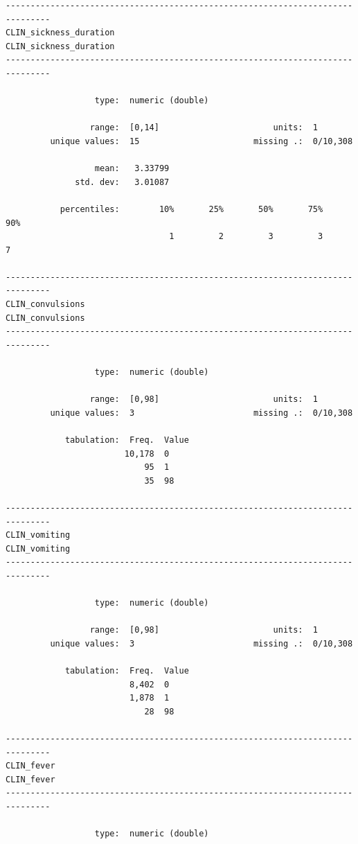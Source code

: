 \documentclass[
  letterpaper,
  DIV=11,
  numbers=noendperiod]{scrreprt}
\begin{document}
\begin{verbatim}
-------------------------------------------------------------------------------
CLIN_sickness_duration                                   CLIN_sickness_duration
-------------------------------------------------------------------------------

                  type:  numeric (double)

                 range:  [0,14]                       units:  1
         unique values:  15                       missing .:  0/10,308

                  mean:   3.33799
              std. dev:   3.01087

           percentiles:        10%       25%       50%       75%       90%
                                 1         2         3         3         7

-------------------------------------------------------------------------------
CLIN_convulsions                                               CLIN_convulsions
-------------------------------------------------------------------------------

                  type:  numeric (double)

                 range:  [0,98]                       units:  1
         unique values:  3                        missing .:  0/10,308

            tabulation:  Freq.  Value
                        10,178  0
                            95  1
                            35  98

-------------------------------------------------------------------------------
CLIN_vomiting                                                     CLIN_vomiting
-------------------------------------------------------------------------------

                  type:  numeric (double)

                 range:  [0,98]                       units:  1
         unique values:  3                        missing .:  0/10,308

            tabulation:  Freq.  Value
                         8,402  0
                         1,878  1
                            28  98

-------------------------------------------------------------------------------
CLIN_fever                                                           CLIN_fever
-------------------------------------------------------------------------------

                  type:  numeric (double)


\end{verbatim}
\end{document}
